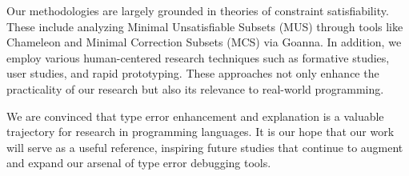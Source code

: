 Our methodologies are largely grounded in theories of constraint satisfiability. These include analyzing Minimal Unsatisfiable Subsets (MUS) through tools like Chameleon and Minimal Correction Subsets (MCS) via Goanna. In addition, we employ various human-centered research techniques such as formative studies, user studies, and rapid prototyping. These approaches not only enhance the practicality of our research but also its relevance to real-world programming.

We are convinced that type error enhancement and explanation is a valuable trajectory for research in programming languages. It is our hope that our work will serve as a useful reference, inspiring future studies that continue to augment and expand our arsenal of type error debugging tools.


